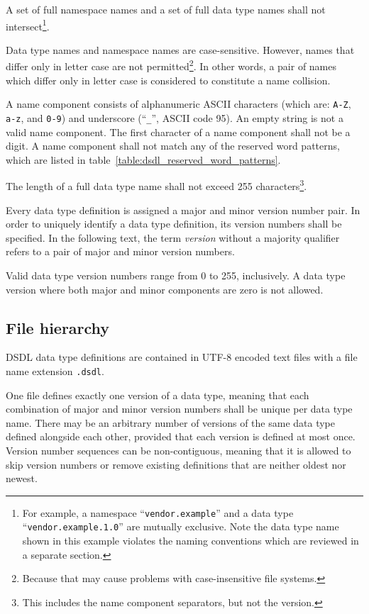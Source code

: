 A set of full namespace names and a set of full data type names shall not intersect\footnote{%
    For example, a namespace ``\texttt{vendor.example}'' and a data type ``\texttt{vendor.example.1.0}''
    are mutually exclusive.
    Note the data type name shown in this example violates the naming conventions
    which are reviewed in a separate section.
}.

Data type names and namespace names are case-sensitive.
However, names that differ only in letter case are not permitted\footnote{%
    Because that may cause problems with case-insensitive file systems.
}.
In other words, a pair of names which differ only in letter case is considered to constitute a name collision.

A name component consists of alphanumeric ASCII characters (which are: \verb|A-Z|, \verb|a-z|, and \verb|0-9|)
and underscore (``\verb|_|'', ASCII code 95).
An empty string is not a valid name component.
The first character of a name component shall not be a digit.
A name component shall not match any of the reserved word patterns,
which are listed in table~\ref{table:dsdl_reserved_word_patterns}.

The length of a full data type name shall not exceed 255
characters\footnote{This includes the name component separators, but not the version.}.

Every data type definition is assigned a major and minor version number pair.
In order to uniquely identify a data type definition, its version numbers shall be specified.
In the following text, the term \emph{version} without a majority qualifier refers to
a pair of major and minor version numbers.

Valid data type version numbers range from 0 to 255, inclusively.
A data type version where both major and minor components are zero is not allowed.

\subsection{File hierarchy}

DSDL data type definitions are contained in UTF-8 encoded text files with a file name extension \verb|.dsdl|.

One file defines exactly one version of a data type,
meaning that each combination of major and minor version numbers shall be unique per data type name.
There may be an arbitrary number of versions of the same data type defined alongside each other,
provided that each version is defined at most once.
Version number sequences can be non-contiguous,
meaning that it is allowed to skip version numbers or remove existing definitions that are neither oldest nor newest.

